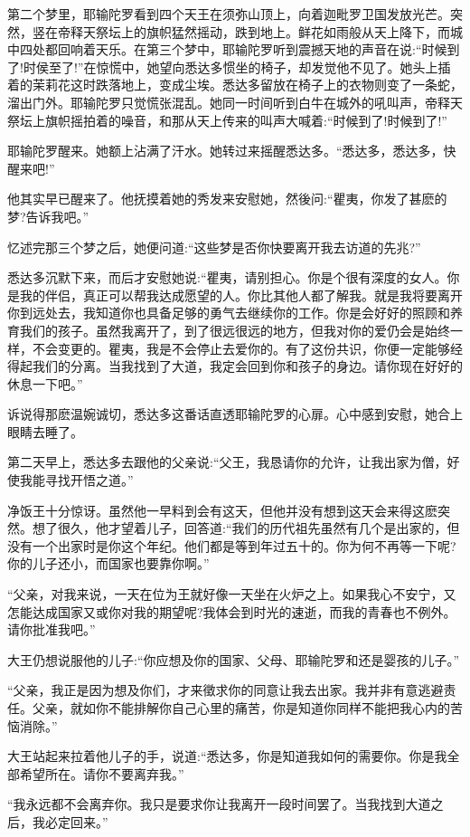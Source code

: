 \documentclass[12pt,twoside,openany]{book}
\begin{document}
第二个梦里，耶输陀罗看到四个天王在须弥山顶上，向着迦毗罗卫国发放光芒。突然，竖在帝释天祭坛上的旗帜猛然摇动，跌到地上。鲜花如雨般从天上降下，而城中四处都回响着天乐。在第三个梦中，耶输陀罗听到震撼天地的声音在说:“时候到了!时侯至了!”在惊慌中，她望向悉达多惯坐的椅子，却发觉他不见了。她头上插着的茉莉花这时跌落地上，变成尘埃。悉达多留放在椅子上的衣物则变了一条蛇，溜出门外。耶输陀罗只觉慌张混乱。她同一时间听到白牛在城外的吼叫声，帝释天祭坛上旗帜摇拍着的噪音，和那从天上传来的叫声大喊着:“时候到了!时候到了!”

耶输陀罗醒来。她额上沾满了汗水。她转过来摇醒悉达多。“悉达多，悉达多，快醒来吧!”

他其实早已醒来了。他抚摸着她的秀发来安慰她，然後问:“瞿夷，你发了甚麽的梦?告诉我吧。”

忆述完那三个梦之后，她便问道:“这些梦是否你快要离开我去访道的先兆?”

悉达多沉默下来，而后才安慰她说:“瞿夷，请别担心。你是个很有深度的女人。你是我的伴侣，真正可以帮我达成愿望的人。你比其他人都了解我。就是我将要离开你到远处去，我知道你也具备足够的勇气去继续你的工作。你是会好好的照顾和养育我们的孩子。虽然我离开了，到了很远很远的地方，但我对你的爱仍会是始终一样，不会变更的。瞿夷，我是不会停止去爱你的。有了这份共识，你便一定能够经得起我们的分离。当我找到了大道，我定会回到你和孩子的身边。请你现在好好的休息一下吧。”

诉说得那麽温婉诚切，悉达多这番话直透耶输陀罗的心扉。心中感到安慰，她合上眼睛去睡了。

第二天早上，悉达多去跟他的父亲说:“父王，我恳请你的允许，让我出家为僧，好使我能寻找开悟之道。”

净饭王十分惊讶。虽然他一早料到会有这天，但他并没有想到这天会来得这麽突然。想了很久，他才望着儿子，回答道:“我们的历代祖先虽然有几个是出家的，但没有一个出家时是你这个年纪。他们都是等到年过五十的。你为何不再等一下呢?你的儿子还小，而国家也要靠你啊。”

“父亲，对我来说，一天在位为王就好像一天坐在火炉之上。如果我心不安宁，又怎能达成国家又或你对我的期望呢?我体会到时光的速逝，而我的青春也不例外。请你批准我吧。”

大王仍想说服他的儿子:“你应想及你的国家、父母、耶输陀罗和还是婴孩的儿子。”

“父亲，我正是因为想及你们，才来徵求你的同意让我去出家。我并非有意逃避责任。父亲，就如你不能排解你自己心里的痛苦，你是知道你同样不能把我心内的苦恼消除。”

大王站起来拉着他儿子的手，说道:“悉达多，你是知道我如何的需要你。你是我全部希望所在。请你不要离弃我。”

“我永远都不会离弃你。我只是要求你让我离开一段时间罢了。当我找到大道之后，我必定回来。”
\end{document}
